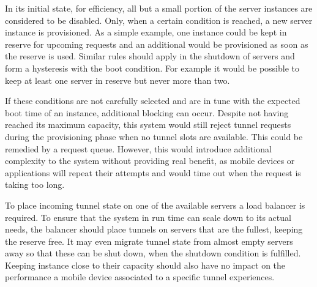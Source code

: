 In its initial state, for efficiency, all but a small portion of the server instances are considered to be disabled.
Only, when a certain condition is reached, a new server instance is provisioned.
As a simple example, one instance could be kept in reserve for upcoming requests and an additional would be provisioned as soon as the reserve is used.
Similar rules should apply in the shutdown of servers and form a hysteresis with the boot condition.
For example it would be possible to keep at least one server in reserve but never more than two.

If these conditions are not carefully selected and are in tune with the expected boot time of an instance, additional blocking can occur.
Despite not having reached its maximum capacity, this system would still reject tunnel requests during the provisioning phase when no tunnel slots are available.
This could be remedied by a request queue.
However, this would introduce additional complexity to the system without providing real benefit, as mobile devices or applications will repeat their attempts and would time out when the request is taking too long. 

To place incoming tunnel state on one of the available servers a load balancer is required. 
To ensure that the system in run time can scale down to its actual needs, the balancer should place tunnels on servers that are the fullest, keeping the reserve free.
It may even migrate tunnel state from almost empty servers away so that these can be shut down, when the shutdown condition is fulfilled.
Keeping instance close to their capacity should also have no impact on the performance a mobile device associated to a specific tunnel experiences.
